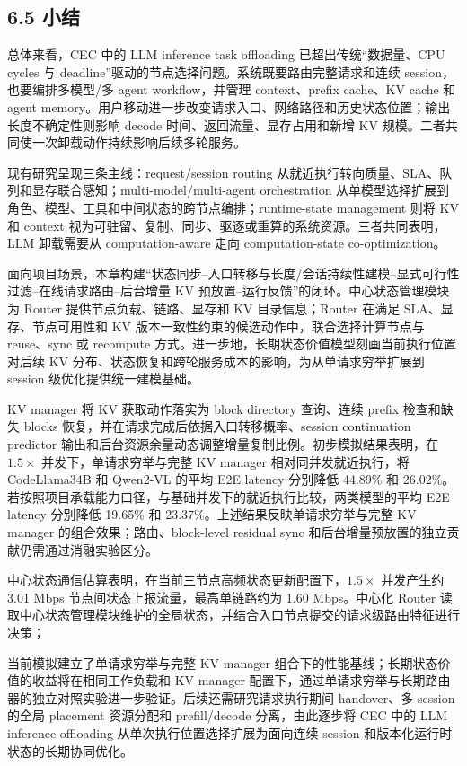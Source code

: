 \subsection*{6.5 小结}

总体来看，CEC 中的 LLM inference task offloading 已超出传统“数据量、CPU cycles 与 deadline”驱动的节点选择问题。系统既要路由完整请求和连续 session，也要编排多模型/多 agent workflow，并管理 context、prefix cache、KV cache 和 agent memory。用户移动进一步改变请求入口、网络路径和历史状态位置；输出长度不确定性则影响 decode 时间、返回流量、显存占用和新增 KV 规模。二者共同使一次卸载动作持续影响后续多轮服务。

现有研究呈现三条主线：request/session routing 从就近执行转向质量、SLA、队列和显存联合感知；multi-model/multi-agent orchestration 从单模型选择扩展到角色、模型、工具和中间状态的跨节点编排；runtime-state management 则将 KV 和 context 视为可驻留、复制、同步、驱逐或重算的系统资源。三者共同表明，LLM 卸载需要从 computation-aware 走向 computation-state co-optimization。

面向项目场景，本章构建“状态同步--入口转移与长度/会话持续性建模--显式可行性过滤--在线请求路由--后台增量 KV 预放置--运行反馈”的闭环。中心状态管理模块为 Router 提供节点负载、链路、显存和 KV 目录信息；Router 在满足 SLA、显存、节点可用性和 KV 版本一致性约束的候选动作中，联合选择计算节点与 reuse、sync 或 recompute 方式。进一步地，长期状态价值模型刻画当前执行位置对后续 KV 分布、状态恢复和跨轮服务成本的影响，为从单请求穷举扩展到 session 级优化提供统一建模基础。

KV manager 将 KV 获取动作落实为 block directory 查询、连续 prefix 检查和缺失 blocks 恢复，并在请求完成后依据入口转移概率、session continuation predictor 输出和后台资源余量动态调整增量复制比例。初步模拟结果表明，在 \(1.5\times\) 并发下，单请求穷举与完整 KV manager 相对同并发就近执行，将 CodeLlama34B 和 Qwen2-VL 的平均 E2E latency 分别降低 44.89\% 和 26.02\%。若按照项目承载能力口径，与基础并发下的就近执行比较，两类模型的平均 E2E latency 分别降低 19.65\% 和 23.37\%。上述结果反映单请求穷举与完整 KV manager 的组合效果；路由、block-level residual sync 和后台增量预放置的独立贡献仍需通过消融实验区分。

中心状态通信估算表明，在当前三节点高频状态更新配置下，\(1.5\times\) 并发产生约 3.01 Mbps 节点间状态上报流量，最高单链路约为 1.60 Mbps。中心化 Router 读取中心状态管理模块维护的全局状态，并结合入口节点提交的请求级路由特征进行决策；

当前模拟建立了单请求穷举与完整 KV manager 组合下的性能基线；长期状态价值的收益将在相同工作负载和 KV manager 配置下，通过单请求穷举与长期路由器的独立对照实验进一步验证。后续还需研究请求执行期间 handover、多 session 的全局 placement 资源分配和 prefill/decode 分离，由此逐步将 CEC 中的 LLM inference offloading 从单次执行位置选择扩展为面向连续 session 和版本化运行时状态的长期协同优化。
